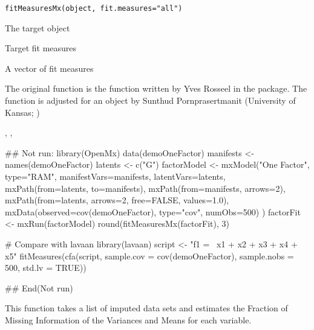 \documentclass[a4paper]{book}
\begin{document}
%
\begin{Usage}
\begin{verbatim}
fitMeasuresMx(object, fit.measures="all")
\end{verbatim}
\end{Usage}
%
\begin{Arguments}
\begin{ldescription}
\item[\code{object}] 
The target  object

\item[\code{fit.measures}] 
Target fit measures

\end{ldescription}
\end{Arguments}
%
\begin{Value}
A vector of fit measures
\end{Value}
%
\begin{Author}\relax
The original function is the  function written by Yves Rosseel in the  package. The function is adjusted for an  object by Sunthud Pornprasertmanit (University of Kansas; )
\end{Author}
%
\begin{SeeAlso}\relax
{}, , 
\end{SeeAlso}
%
\begin{Examples}
\begin{ExampleCode}
## Not run: 
library(OpenMx)
data(demoOneFactor)
manifests <- names(demoOneFactor)
latents <- c("G")
factorModel <- mxModel("One Factor", 
    type="RAM",
    manifestVars=manifests, 
    latentVars=latents,
    mxPath(from=latents, to=manifests),
    mxPath(from=manifests, arrows=2),
    mxPath(from=latents, arrows=2, free=FALSE, values=1.0),
    mxData(observed=cov(demoOneFactor), type="cov", numObs=500)
)
factorFit <- mxRun(factorModel)
round(fitMeasuresMx(factorFit), 3)

# Compare with lavaan
library(lavaan)
script <- "f1 =~ x1 + x2 + x3 + x4 + x5"
fitMeasures(cfa(script, sample.cov = cov(demoOneFactor), sample.nobs = 500, std.lv = TRUE))

## End(Not run)
\end{ExampleCode}
\end{Examples}
%
\begin{Description}\relax
This function takes a list of imputed data sets and estimates the Fraction of Missing Information of the Variances and Means for each variable.
\end{Description}
\end{document}
